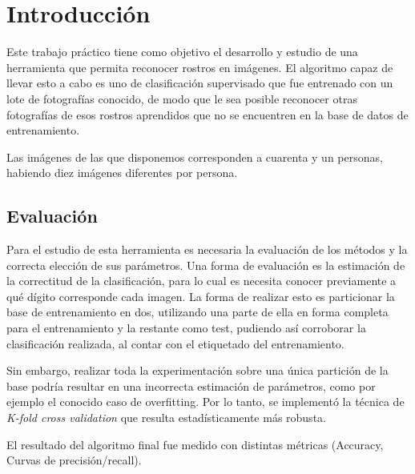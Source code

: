 \section{Introducción}

Este trabajo práctico tiene como objetivo el desarrollo y estudio de una herramienta que permita reconocer rostros en imágenes. El algoritmo capaz de llevar esto a cabo es uno de clasificación supervisado que fue entrenado con un lote de fotografías conocido, de modo que le sea posible reconocer otras fotografías de esos rostros aprendidos que no se encuentren en la base de datos de entrenamiento.

Las imágenes de las que disponemos corresponden a cuarenta y un personas, habiendo diez imágenes diferentes por persona.

\subsection{Evaluación}

Para el estudio de esta herramienta es necesaria la evaluación de los métodos y la correcta elección de sus parámetros. Una forma de evaluación es la estimación de la correctitud de la clasificación, para lo cual es necesita conocer previamente a qué dígito corresponde cada imagen. La forma de realizar esto es particionar la base de entrenamiento en dos, utilizando una parte de ella en forma completa para el entrenamiento y la restante como test, pudiendo así corroborar la clasificación realizada, al contar con el etiquetado del entrenamiento.

Sin embargo, realizar toda la experimentación sobre una única partición de la base podría resultar en una incorrecta estimación de parámetros, como por ejemplo el conocido caso de overfitting. Por lo tanto, se implementó la técnica de \textit{K-fold cross validation} que resulta estadísticamente más robusta.

El resultado del algoritmo final fue medido con distintas métricas (Accuracy, Curvas de precisión/recall).

